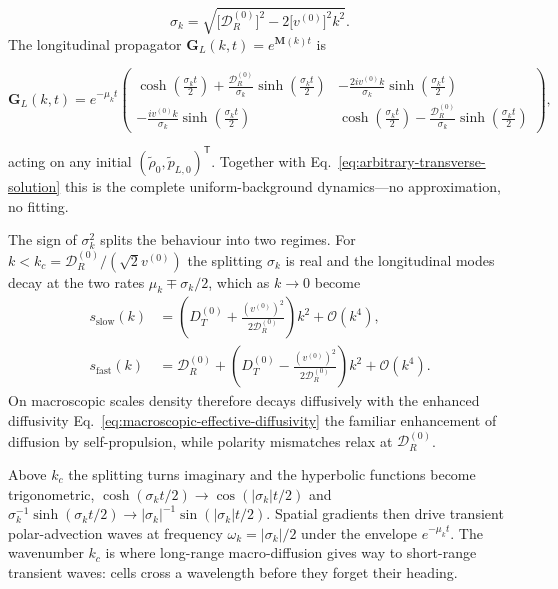 \documentclass[
  reprint,
  superscriptaddress,
  amsmath,
  amssymb,
  aps,
  pre,
  nofootinbib,
  floatfix
]{revtex4-2}
\newcommand{\ord}{\mathcal O}
\newcommand{\DR}{\mathcal D_R^{(0)}}
\begin{document}
\begin{equation}
 \sigma_k = \sqrt{\bigl[\DR\bigr]^2 - 2\bigl[v^{(0)}\bigr]^2 k^2}.
 \label{eq:longitudinal-spectral-scales}
\end{equation}
The longitudinal propagator $\mathbf G_L(k,t)=e^{\mathbf M(k)t}$ is
\begin{widetext}
\begin{equation}
 \mathbf G_L(k,t)
 =e^{-\mu_kt}
 \begin{pmatrix}
 \displaystyle
 \cosh\!\left(\frac{\sigma_kt}{2}\right)
 +\frac{\DR}{\sigma_k}
 \sinh\!\left(\frac{\sigma_kt}{2}\right)
 &\displaystyle
 -\frac{2iv^{(0)}k}{\sigma_k}
 \sinh\!\left(\frac{\sigma_kt}{2}\right)
 \\
 \displaystyle
 -\frac{iv^{(0)}k}{\sigma_k}
 \sinh\!\left(\frac{\sigma_kt}{2}\right)
 &\displaystyle
 \cosh\!\left(\frac{\sigma_kt}{2}\right)
 -\frac{\DR}{\sigma_k}
 \sinh\!\left(\frac{\sigma_kt}{2}\right)
 \end{pmatrix},
 \label{eq:longitudinal-green-matrix}
\end{equation}
\end{widetext}
acting on any initial $(\tilde\rho_0,\tilde p_{L,0})^{\mathsf T}$.  Together
with Eq.~\eqref{eq:arbitrary-transverse-solution} this is the complete
uniform-background dynamics---no approximation, no fitting.

The sign of $\sigma_k^2$ splits the behaviour into two regimes.  For
$k<k_c=\DR/(\sqrt2v^{(0)})$ the splitting $\sigma_k$ is real and the
longitudinal modes decay at the two rates $\mu_k\mp\sigma_k/2$, which as
$k\to0$ become
\begin{align}
 s_{\text{slow}}(k) &= \left(D_T^{(0)} + \frac{(v^{(0)})^2}{2\DR}\right)k^2 + \ord(k^4), \label{eq:slow-diffusive-mode}\\
 s_{\text{fast}}(k) &= \DR + \left(D_T^{(0)} - \frac{(v^{(0)})^2}{2\DR}\right)k^2 + \ord(k^4). \label{eq:fast-relaxing-mode}
\end{align}
On macroscopic scales density therefore decays diffusively with the enhanced
diffusivity
Eq.~\eqref{eq:macroscopic-effective-diffusivity}
the familiar enhancement of diffusion by self-propulsion, while polarity
mismatches relax at $\DR$.

Above $k_c$ the splitting turns imaginary and the hyperbolic functions become
trigonometric, $\cosh(\sigma_kt/2)\to\cos(|\sigma_k|t/2)$ and
$\sigma_k^{-1}\sinh(\sigma_kt/2)\to|\sigma_k|^{-1}\sin(|\sigma_k|t/2)$.
Spatial gradients then drive transient polar-advection waves at frequency
$\omega_k=|\sigma_k|/2$ under the envelope $e^{-\mu_kt}$.  The wavenumber
$k_c$ is where long-range macro-diffusion gives way to short-range transient
waves: cells cross a wavelength before they forget their heading.
\end{document}

